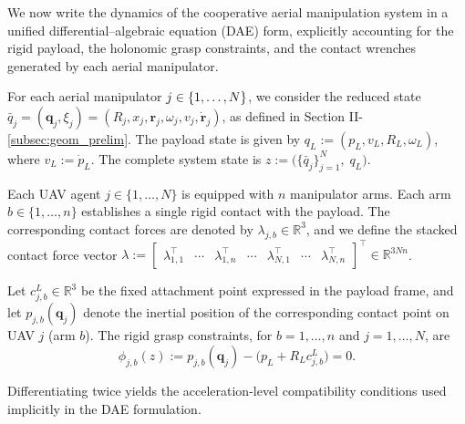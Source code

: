 \documentclass[letterpaper, 10 pt, conference]{ieeeconf}  %
\newcommand{\0}{\matr{0}}
\begin{document}
We now write the dynamics of the cooperative aerial manipulation system in a unified
differential--algebraic equation (DAE) form, explicitly accounting for the rigid payload,
the holonomic grasp constraints, and the contact wrenches generated by each aerial manipulator.


For each aerial manipulator $j\in\mathcal \{1,\dots,N\}$, we consider the reduced state $\bar q_j=(\mathbf q_j,\xi_j)=(R_j,x_j,\mathbf r_j,\omega_j,v_j,\dot{\mathbf r}_j)$, as defined in Section II-\ref{subsec:geom_prelim}.
The payload state is given by $q_L:=(p_L,v_L,R_L,\omega_L)$, where $v_L:=\dot p_L$.
The complete system state is $z := \Big(\{\bar q_j\}_{j=1}^N,\; q_L\Big)$.



Each UAV agent $j\in\{1,\dots,N\}$ is equipped with $n$ manipulator arms.
Each arm $b\in\{1,\dots,n\}$ establishes a single rigid contact with the payload.
The corresponding contact forces are denoted by $\lambda_{j,b}\in\mathbb R^3$, and we define the stacked
contact force vector $\lambda :=
\begin{bmatrix}
\lambda_{1,1}^\top & \cdots & \lambda_{1,n}^\top &
\cdots &
\lambda_{N,1}^\top & \cdots & \lambda_{N,n}^\top
\end{bmatrix}^{\top}
\in\mathbb R^{3Nn}$.



Let $c^L_{j,b}\in\mathbb R^3$ be the fixed attachment point expressed in the payload frame,
and let $p_{j,b}(\mathbf q_j)$ denote the inertial position of the corresponding contact
point on UAV $j$ (arm $b$).
The rigid grasp constraints, for $b=1,\dots,n$ and $j=1,\dots,N$, are
\begin{equation}\label{eq:dae_constraints}
\phi_{j,b}(z) :=
p_{j,b}(\mathbf q_j) - \big(p_L + R_L c^L_{j,b}\big) = 0.
\end{equation}


Differentiating twice yields the acceleration-level compatibility conditions used implicitly
in the DAE formulation.
\end{document}
